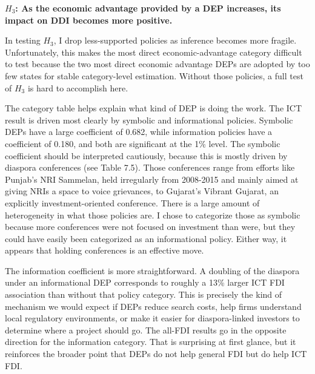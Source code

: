 \documentclass[doublespace,nopageskip]{UVAthesis}
\begin{document}
\textbf{$H_3$: As the economic advantage provided by a DEP increases, its impact on DDI becomes more positive.}



In testing $H_3$, I drop less-supported policies as inference becomes more fragile. Unfortunately, this makes the most direct economic-advantage category difficult to test because the two most direct economic advantage DEPs are adopted by too few states for stable category-level estimation. Without those policies, a full test of $H_3$ is hard to accomplish here.

The category table helps explain what kind of DEP is doing the work. The ICT result is driven most clearly by symbolic and informational policies. Symbolic DEPs have a large coefficient of 0.682, while information policies have a coefficient of 0.180, and both are significant at the 1\% level. The symbolic coefficient should be interpreted cautiously, because this is mostly driven by diaspora conferences (see Table 7.5). Those conferences range from efforts like Punjab's NRI Sammelan, held irregularly from 2008-2015 and mainly aimed at giving NRIs a space to voice grievances, to Gujarat's Vibrant Gujarat, an explicitly investment-oriented conference. There is a large amount of heterogeneity in what those policies are. I chose to categorize those as symbolic because more conferences were not focused on investment than were, but they could have easily been categorized as an informational policy. Either way, it appears that holding conferences is an effective move.

The information coefficient is more straightforward. A doubling of the diaspora under an informational DEP corresponds to roughly a 13\% larger ICT FDI association than without that policy category. This is precisely the kind of mechanism we would expect if DEPs reduce search costs, help firms understand local regulatory environments, or make it easier for diaspora-linked investors to determine where a project should go. The all-FDI results go in the opposite direction for the information category. That is surprising at first glance, but it reinforces the broader point that DEPs do not help general FDI but do help ICT FDI.

\end{document}
